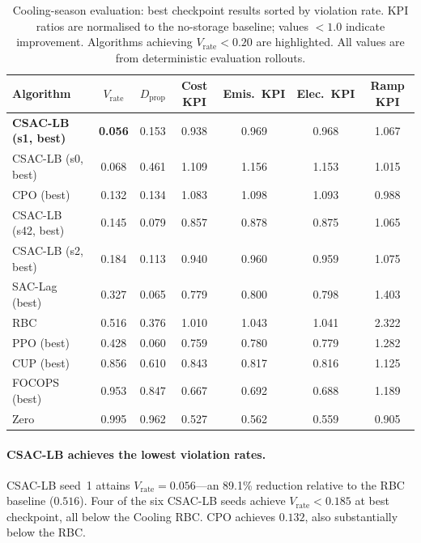 \begin{table}[htbp]
\centering
\caption{Cooling-season evaluation: best checkpoint results sorted by violation
  rate.  KPI ratios are normalised to the no-storage baseline; values $<1.0$
  indicate improvement.  Algorithms achieving $V_{\text{rate}} < 0.20$ are
  highlighted.  All values are from deterministic evaluation rollouts.}
\label{tab:temp-full-benchmark}
\begin{tabular}{lcccccc}
\toprule
\textbf{Algorithm}
  & \textbf{$V_{\text{rate}}$}
  & \textbf{$D_{\text{prop}}$}
  & \textbf{Cost KPI}
  & \textbf{Emis.\ KPI}
  & \textbf{Elec.\ KPI}
  & \textbf{Ramp KPI} \\
\midrule
\textbf{CSAC-LB (s1, best)} & \textbf{0.056} & 0.153 & 0.938 & 0.969 & 0.968 & 1.067 \\
CSAC-LB (s0, best)          & 0.068          & 0.461 & 1.109 & 1.156 & 1.153 & 1.015 \\
CPO (best)                  & 0.132          & 0.134 & 1.083 & 1.098 & 1.093 & 0.988 \\
CSAC-LB (s42, best)         & 0.145          & 0.079 & 0.857 & 0.878 & 0.875 & 1.065 \\
CSAC-LB (s2, best)          & 0.184          & 0.113 & 0.940 & 0.960 & 0.959 & 1.075 \\
\midrule
SAC-Lag (best)              & 0.327          & 0.065 & 0.779 & 0.800 & 0.798 & 1.403 \\
\midrule
RBC                         & 0.516          & 0.376 & 1.010 & 1.043 & 1.041 & 2.322 \\
PPO (best)                  & 0.428          & 0.060 & 0.759 & 0.780 & 0.779 & 1.282 \\
\midrule
CUP (best)                  & 0.856          & 0.610 & 0.843 & 0.817 & 0.816 & 1.125 \\
FOCOPS (best)               & 0.953          & 0.847 & 0.667 & 0.692 & 0.688 & 1.189 \\
Zero                        & 0.995          & 0.962 & 0.527 & 0.562 & 0.559 & 0.905 \\
\bottomrule
\end{tabular}
\end{table}

\paragraph{CSAC-LB achieves the lowest violation rates.}
CSAC-LB seed~1 attains $V_{\text{rate}} = 0.056$---an 89.1\% reduction
relative to the RBC baseline ($0.516$).  Four of the six CSAC-LB seeds achieve
$V_{\text{rate}} < 0.185$ at best checkpoint, all below the Cooling RBC.
CPO achieves $0.132$, also substantially below the RBC.

